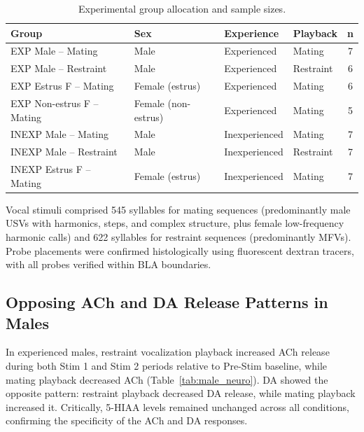 \documentclass[11pt]{article}
\begin{document}
\begin{table}[H]
\centering
\caption{Experimental group allocation and sample sizes.}
\label{tab:groups}
\begin{tabular}{llllc}
\toprule
\textbf{Group} & \textbf{Sex} & \textbf{Experience} & \textbf{Playback} & \textbf{n} \\
\midrule
EXP Male -- Mating & Male & Experienced & Mating & 7 \\
EXP Male -- Restraint & Male & Experienced & Restraint & 6 \\
EXP Estrus F -- Mating & Female (estrus) & Experienced & Mating & 6 \\
EXP Non-estrus F -- Mating & Female (non-estrus) & Experienced & Mating & 5 \\
INEXP Male -- Mating & Male & Inexperienced & Mating & 7 \\
INEXP Male -- Restraint & Male & Inexperienced & Restraint & 7 \\
INEXP Estrus F -- Mating & Female (estrus) & Inexperienced & Mating & 7 \\
\bottomrule
\end{tabular}
\end{table}

Vocal stimuli comprised 545 syllables for mating sequences (predominantly male USVs with harmonics, steps, and complex structure, plus female low-frequency harmonic calls) and 622 syllables for restraint sequences (predominantly MFVs). Probe placements were confirmed histologically using fluorescent dextran tracers, with all probes verified within BLA boundaries.

\subsection{Opposing ACh and DA Release Patterns in Males}

In experienced males, restraint vocalization playback increased ACh release during both Stim 1 and Stim 2 periods relative to Pre-Stim baseline, while mating playback decreased ACh (Table~\ref{tab:male_neuro}). DA showed the opposite pattern: restraint playback decreased DA release, while mating playback increased it. Critically, 5-HIAA levels remained unchanged across all conditions, confirming the specificity of the ACh and DA responses.
\end{document}
